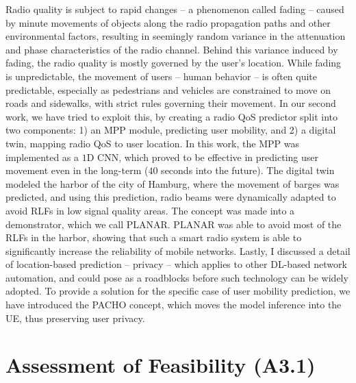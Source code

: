 	Radio quality is subject to rapid changes -- a phenomenon called fading -- caused by minute movements of objects along the radio propagation paths and other environmental factors, resulting in seemingly random variance in the attenuation and phase characteristics of the radio channel.
	Behind this variance induced by fading, the radio quality is mostly governed by the user's location.
	While fading is unpredictable, the movement of users -- human behavior -- is often quite predictable, especially as pedestrians and vehicles are constrained to move on roads and sidewalks, with strict rules governing their movement.
	In our second work, we have tried to exploit this, by creating a radio \ac{QoS} predictor split into two components: 1) an \ac{MPP} module, predicting user mobility, and 2) a digital twin, mapping radio \ac{QoS} to user location.
	In this work, the \ac{MPP} was implemented as a $1$D \ac{CNN}, which proved to be effective in predicting user movement even in the long-term ($40$ seconds into the future).
	The digital twin modeled the harbor of the city of Hamburg, where the movement of barges was predicted, and using this prediction, radio beams were dynamically adapted to avoid \acp{RLF} in low signal quality areas.
	The concept was made into a demonstrator, which we call \ac{PLANAR}.
	\ac{PLANAR} was able to avoid most of the \acp{RLF} in the harbor, showing that such a smart radio system is able to significantly increase the reliability of mobile networks.	
	Lastly, I discussed a detail of location-based prediction -- privacy -- which applies to other \ac{DL}-based network automation, and could pose as a roadblocks before such technology can be widely adopted.
	To provide a solution for the specific case of user mobility prediction, we have introduced the \ac{PACHO} concept, which moves the model inference into the \ac{UE}, thus preserving user privacy.
	
	\section{Assessment of Feasibility (A3.1)}
	
